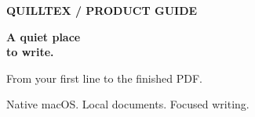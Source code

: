 \documentclass[11pt]{article}
\begin{document}
{\small\bfseries\color{accent} QUILLTEX / PRODUCT GUIDE}
\vspace{8mm}

{\fontsize{36}{40}\selectfont\bfseries A quiet place\\to write.}
\vspace{4mm}

{\large\color{muted} From your first line to the finished PDF.}
\vspace{4mm}




\vfill
{\small\color{muted} Native macOS. Local documents. Focused writing.}
\end{document}
